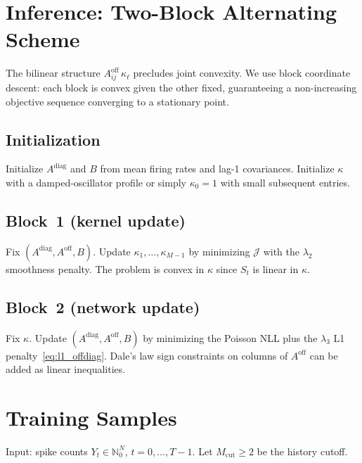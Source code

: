 \documentclass[11pt]{article}
\begin{document}
\section{Inference: Two-Block Alternating Scheme}
\label{sec:inference}

The bilinear structure \(A^{\mathrm{off}}_{ij}\,\kappa_\ell\) precludes joint convexity. We use block coordinate descent: each block is convex given the other fixed, guaranteeing a non-increasing objective sequence converging to a stationary point.

\subsection{Initialization}
Initialize \(A^{\mathrm{diag}}\) and \(B\) from mean firing rates and lag-1 covariances.
Initialize \(\kappa\) with a damped-oscillator profile or simply \(\kappa_0=1\) with small subsequent entries.

\subsection{Block~1 (kernel update)}
Fix \((A^{\mathrm{diag}}, A^{\mathrm{off}}, B)\). Update \(\kappa_1,\dots,\kappa_{M-1}\) by minimizing \(\mathcal{J}\) with the \(\lambda_2\) smoothness penalty. The problem is convex in \(\kappa\) since \(S_t\) is linear in \(\kappa\).

\subsection{Block~2 (network update)}
Fix \(\kappa\). Update \((A^{\mathrm{diag}}, A^{\mathrm{off}}, B)\) by minimizing the Poisson NLL plus the \(\lambda_3\) L1 penalty~\eqref{eq:l1_offdiag}. Dale's law sign constraints on columns of \(A^{\mathrm{off}}\) can be added as linear inequalities.

\section{Training Samples}
\label{sec:training}

Input: spike counts \(Y_t \in \mathbb{N}_0^{N}\), \(t=0,\dots,T-1\).
Let \(M_{\mathrm{cut}} \ge 2\) be the history cutoff.
\end{document}
